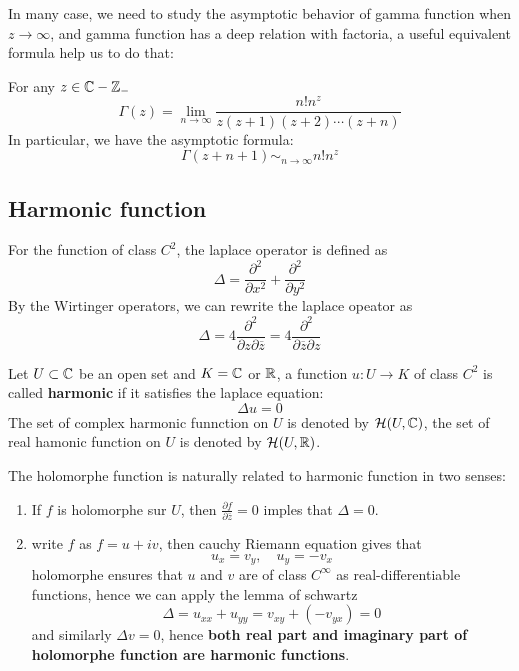 \documentclass[12pt,a4paper]{article}
\begin{document}
In many case, we need to study the asymptotic behavior of gamma function when \(z \rightarrow \infty\), and gamma function has a deep relation with factoria, a useful equivalent formula help us to do that:
\begin{proposition}
    For any \(z \in \mathbb{C} - \mathbb{Z}_{-}\)
    \[\Gamma(z) = \lim_{n \to \infty} \frac{n! n^z}{z(z+1)(z+2)\cdots(z+n)}\]
    In particular, we have the asymptotic formula:
    \[\Gamma(z+n+1) \sim_{n \rightarrow \infty} n!n^z\]
\end{proposition}

\subsection{Harmonic function}

For the function of class \(C^2\), the laplace operator is defined as
\[\Delta = \frac{\partial^2}{\partial x^2} + \frac{\partial^2}{\partial y^2}\]
By the Wirtinger operators, we can rewrite the laplace opeator as
\[\Delta = 4\frac{\partial^2}{\partial z \partial \overline{z}} = 4\frac{\partial^2}{\partial \overline{z} \partial z}\]

\begin{definition}
    Let \(U \subset \mathbb{C}\) be an open set and \(K= \mathbb{C}\) or \(\mathbb{R}\), a function \(u: U \to K\) of class \(C^2\) is called \textbf{harmonic} if it satisfies the laplace equation:
    \[\Delta u = 0\]
    The set of complex harmonic funnction on \(U\) is denoted by \(\mathcal{H}(U,\mathbb{C})\), the set of real hamonic function on \(U\) is denoted by \(\mathcal{H}(U,\mathbb{R})\).
\end{definition}

The holomorphe function is naturally related to harmonic function in two senses:
\begin{enumerate}
    \item If \(f \) is holomorphe sur \(U\), then \(\frac{\partial f}{ \partial \bar{z}} = 0\) imples that \(\Delta = 0\).
    \item write \(f\) as \(f = u + iv\), then cauchy Riemann equation gives that
    \[u_x = v_y, \quad u_y = -v_x\]
    holomorphe ensures that \(u\) and \(v\) are of class \(C^{\infty}\) as real-differentiable functions, hence we can apply the lemma of schwartz
    \[\Delta = u_{xx}+u_{yy} = v_{xy} + (-v_{yx}) = 0\]
    and similarly \(\Delta v = 0\), hence \textbf{both real part and imaginary part of holomorphe function are harmonic functions}.
\end{enumerate}
\end{document}
